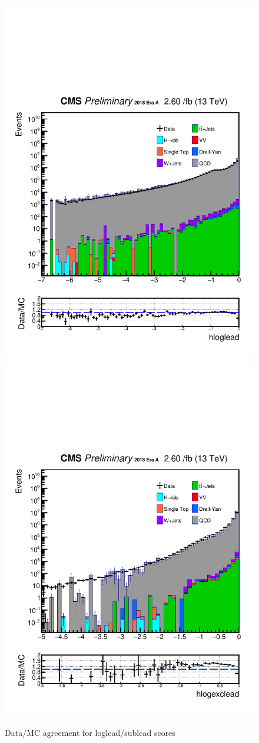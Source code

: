 \begin{figure}[h!]
  \caption{Data/MC agreement for loglead/sublead scores}
  \label{fig:DataMCscore}
  \centering
  \includegraphics[width=0.67\linewidth]{figs/Data_log_AnalysisNote_MS-15_ctauS-10_hloglead.pdf}
  \includegraphics[width=0.67\linewidth]{figs/Data_log_AnalysisNote_MS-15_ctauS-10_hlogexclead.pdf}
\end{figure}

